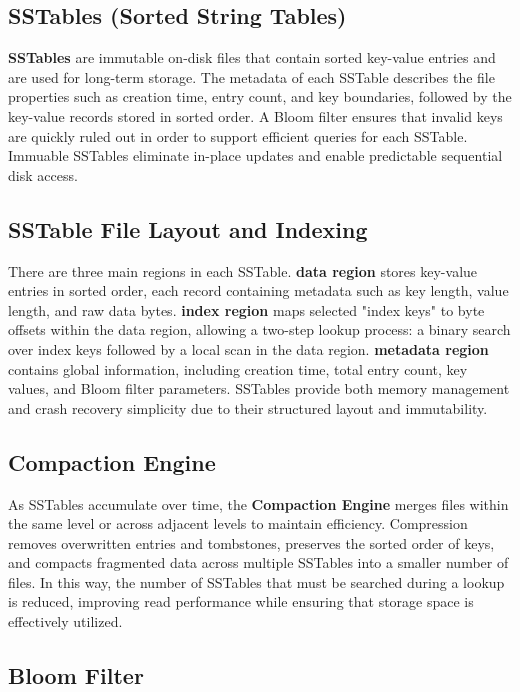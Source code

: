\documentclass{mnitjaipur}
\begin{document}
\subsection{SSTables (Sorted String Tables)}

\textbf{SSTables} are immutable on-disk files that contain sorted key-value entries and are used for long-term storage. The metadata of each SSTable describes the file properties such as creation time, entry count, and key boundaries, followed by the key-value records stored in sorted order. A Bloom filter ensures that invalid keys are quickly ruled out in order to support efficient queries for each SSTable. Immuable SSTables eliminate in-place updates and enable predictable sequential disk access.

\subsection{SSTable File Layout and Indexing}

There are three main regions in each SSTable. \textbf{data region} stores key-value entries in sorted order, each record containing metadata such as key length, value length, and raw data bytes. \textbf{index region} maps selected "index keys" to byte offsets within the data region, allowing a two-step lookup process: a binary search over index keys followed by a local scan in the data region. \textbf{metadata region} contains global information, including creation time, total entry count, key values, and Bloom filter parameters. SSTables provide both memory management and crash recovery simplicity due to their structured layout and immutability.

\subsection{Compaction Engine}

As SSTables accumulate over time, the \textbf{Compaction Engine} merges files within the same level or across adjacent levels to maintain efficiency. Compression removes overwritten entries and tombstones, preserves the sorted order of keys, and compacts fragmented data across multiple SSTables into a smaller number of files. In this way, the number of SSTables that must be searched during a lookup is reduced, improving read performance while ensuring that storage space is effectively utilized.

\subsection{Bloom Filter}
\end{document}
